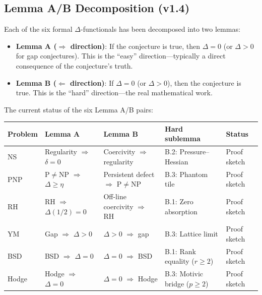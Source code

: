 \documentclass[11pt]{article}
\begin{document}
\subsection{Lemma A/B Decomposition (v1.4)}
\label{sec:lemma-ab}

Each of the six formal $\Delta$-functionals has been decomposed into two lemmas:

\begin{itemize}
  \item \textbf{Lemma A ($\Rightarrow$ direction)}: If the conjecture is true, then $\Delta = 0$ (or $\Delta > 0$ for gap conjectures). This is the ``easy'' direction---typically a direct consequence of the conjecture's truth.
  \item \textbf{Lemma B ($\Leftarrow$ direction)}: If $\Delta = 0$ (or $\Delta > 0$), then the conjecture is true. This is the ``hard'' direction---the real mathematical work.
\end{itemize}

\noindent The current status of the six Lemma A/B pairs:

\begin{center}
\begin{tabular}{lllll}
\hline
\textbf{Problem} & \textbf{Lemma A} & \textbf{Lemma B} & \textbf{Hard sublemma} & \textbf{Status} \\
\hline
NS   & Regularity $\Rightarrow$ $\delta = 0$ & Coercivity $\Rightarrow$ regularity & B.2: Pressure--Hessian & Proof sketch \\
PNP  & P$\neq$NP $\Rightarrow$ $\Delta \geq \eta$ & Persistent defect $\Rightarrow$ P$\neq$NP & B.3: Phantom tile & Proof sketch \\
RH   & RH $\Rightarrow$ $\Delta(1/2)=0$ & Off-line coercivity $\Rightarrow$ RH & B.1: Zero absorption & Proof sketch \\
YM   & Gap $\Rightarrow$ $\Delta > 0$ & $\Delta > 0$ $\Rightarrow$ gap & B.3: Lattice limit & Proof sketch \\
BSD  & BSD $\Rightarrow$ $\Delta = 0$ & $\Delta = 0$ $\Rightarrow$ BSD & B.1: Rank equality ($r \geq 2$) & Proof sketch \\
Hodge& Hodge $\Rightarrow$ $\Delta = 0$ & $\Delta = 0$ $\Rightarrow$ Hodge & B.3: Motivic bridge ($p \geq 2$) & Proof sketch \\
\hline
\end{tabular}
\end{center}
\end{document}

